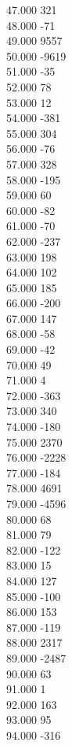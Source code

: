 { 47.000	321 \\
 48.000	-71 \\
 49.000	9557 \\
 50.000	-9619 \\
 51.000	-35 \\
 52.000	78 \\
 53.000	12 \\
 54.000	-381 \\
 55.000	304 \\
 56.000	-76 \\
 57.000	328 \\
 58.000	-195 \\
 59.000	60 \\
 60.000	-82 \\
 61.000	-70 \\
 62.000	-237 \\
 63.000	198 \\
 64.000	102 \\
 65.000	185 \\
 66.000	-200 \\
 67.000	147 \\
 68.000	-58 \\
 69.000	-42 \\
 70.000	49 \\
 71.000	4 \\
 72.000	-363 \\
 73.000	340 \\
 74.000	-180 \\
 75.000	2370 \\
 76.000	-2228 \\
 77.000	-184 \\
 78.000	4691 \\
 79.000	-4596 \\
 80.000	68 \\
 81.000	79 \\
 82.000	-122 \\
 83.000	15 \\
 84.000	127 \\
 85.000	-100 \\
 86.000	153 \\
 87.000	-119 \\
 88.000	2317 \\
 89.000	-2487 \\
 90.000	63 \\
 91.000	1 \\
 92.000	163 \\
 93.000	95 \\
 94.000	-316 \\
}
